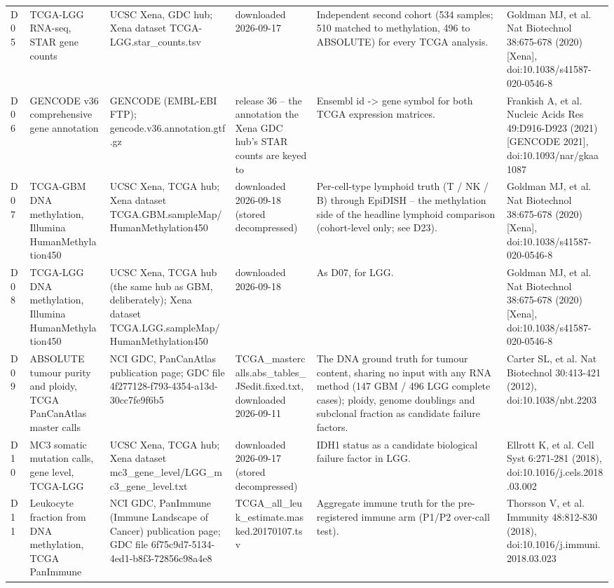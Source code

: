\begin{table}[htbp]
\begin{tabular}{llllll}
D05 & TCGA-LGG RNA-seq, STAR gene counts & UCSC Xena, GDC hub; Xena dataset TCGA-LGG.star\_counts.tsv & downloaded 2026-09-17 & Independent second cohort (534 samples; 510 matched to methylation, 496 to ABSOLUTE) for every TCGA analysis. & Goldman MJ, et al. Nat Biotechnol 38:675-678 (2020) [Xena], doi:10.1038/s41587-020-0546-8 \\
D06 & GENCODE v36 comprehensive gene annotation & GENCODE (EMBL-EBI FTP); gencode.v36.annotation.gtf.gz & release 36 -- the annotation the Xena GDC hub's STAR counts are keyed to & Ensembl id -> gene symbol for both TCGA expression matrices. & Frankish A, et al. Nucleic Acids Res 49:D916-D923 (2021) [GENCODE 2021], doi:10.1093/nar/gkaa1087 \\
D07 & TCGA-GBM DNA methylation, Illumina HumanMethylation450 & UCSC Xena, TCGA hub; Xena dataset TCGA.GBM.sampleMap/HumanMethylation450 & downloaded 2026-09-18 (stored decompressed) & Per-cell-type lymphoid truth (T / NK / B) through EpiDISH -- the methylation side of the headline lymphoid comparison (cohort-level only; see D23). & Goldman MJ, et al. Nat Biotechnol 38:675-678 (2020) [Xena], doi:10.1038/s41587-020-0546-8 \\
D08 & TCGA-LGG DNA methylation, Illumina HumanMethylation450 & UCSC Xena, TCGA hub (the same hub as GBM, deliberately); Xena dataset TCGA.LGG.sampleMap/HumanMethylation450 & downloaded 2026-09-18 & As D07, for LGG. & Goldman MJ, et al. Nat Biotechnol 38:675-678 (2020) [Xena], doi:10.1038/s41587-020-0546-8 \\
D09 & ABSOLUTE tumour purity and ploidy, TCGA PanCanAtlas master calls & NCI GDC, PanCanAtlas publication page; GDC file 4f277128-f793-4354-a13d-30cc7fe9f6b5 & TCGA\_mastercalls.abs\_tables\_JSedit.fixed.txt, downloaded 2026-09-11 & The DNA ground truth for tumour content, sharing no input with any RNA method (147 GBM / 496 LGG complete cases); ploidy, genome doublings and subclonal fraction as candidate failure factors. & Carter SL, et al. Nat Biotechnol 30:413-421 (2012), doi:10.1038/nbt.2203 \\
D10 & MC3 somatic mutation calls, gene level, TCGA-LGG & UCSC Xena, TCGA hub; Xena dataset mc3\_gene\_level/LGG\_mc3\_gene\_level.txt & downloaded 2026-09-17 (stored decompressed) & IDH1 status as a candidate biological failure factor in LGG. & Ellrott K, et al. Cell Syst 6:271-281 (2018), doi:10.1016/j.cels.2018.03.002 \\
D11 & Leukocyte fraction from DNA methylation, TCGA PanImmune & NCI GDC, PanImmune (Immune Landscape of Cancer) publication page; GDC file 6f75c9d7-5134-4ed1-b8f3-72856c98a4e8 & TCGA\_all\_leuk\_estimate.masked.20170107.tsv & Aggregate immune truth for the pre-registered immune arm (P1/P2 over-call test). & Thorsson V, et al. Immunity 48:812-830 (2018), doi:10.1016/j.immuni.2018.03.023 \\

\end{tabular}
\end{table}
